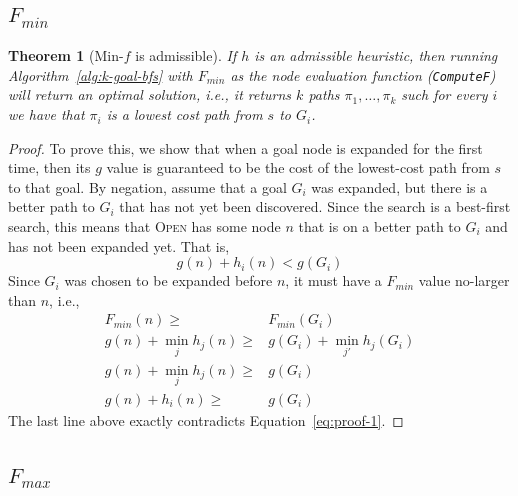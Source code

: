 \documentclass{aicom2e}
\newtheorem{theorem}{Theorem}
\newcommand{\open}{\textsc{Open}}
\begin{document}
\subsection{$F_{min}$}

\begin{theorem}[Min-$f$ is admissible]
If $h$ is an admissible heuristic, then running Algorithm~\ref{alg:k-goal-bfs} with $F_{min}$ 
as the node evaluation function ({\tt ComputeF}) will return an optimal solution, i.e., 
it returns $k$ paths $\pi_1,\ldots, \pi_k$ such for every $i$ we have that $\pi_i$ is a lowest cost path from $s$ to $G_i$. 
\label{the:min-f}
\end{theorem}
 \begin{proof}
To prove this, we show that when a goal node is expanded for the first time, then its $g$ value is guaranteed to 
be the cost of the lowest-cost path from $s$ to that goal. 
By negation, assume that a goal $G_i$ was expanded, but there is a better path to $G_i$
that has not yet been discovered. Since the search is a best-first search, this means
that \open{} has some node $n$ that is on a better path to $G_i$ and has not been expanded yet. 
That is, 
\begin{equation}
g(n)+h_i(n)<g(G_i)
\label{eq:proof-1}
\end{equation}
Since $G_i$ was chosen to be expanded before $n$, it must have a $F_{min}$ value no-larger than $n$, i.e.,
\begin{align}
F_{min}(n) \geq & F_{min}(G_i)\\
g(n)+\min_j h_j(n) \geq & g(G_i)+\min_{j'} h_j(G_i)\\
g(n)+\min_j h_j(n) \geq & g(G_i)\\
g(n)+h_i(n) \geq & g(G_i) 
\end{align}
The last line above exactly contradicts Equation~\ref{eq:proof-1}. 
\end{proof}



\subsection{$F_{max}$}
 
\end{document}
